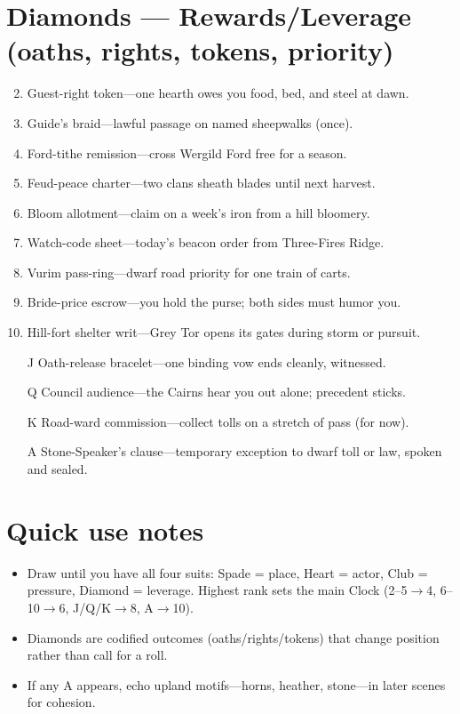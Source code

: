 \section*{Diamonds --- Rewards/Leverage (oaths, rights, tokens, priority)}
\begin{enumerate}
\setcounter{enumi}{1}
\item Guest-right token---one hearth owes you food, bed, and steel at dawn.
\item Guide's braid---lawful passage on named sheepwalks (once).
\item Ford-tithe remission---cross Wergild Ford free for a season.
\item Feud-peace charter---two clans sheath blades until next harvest.
\item Bloom allotment---claim on a week's iron from a hill bloomery.
\item Watch-code sheet---today's beacon order from Three-Fires Ridge.
\item Vurim pass-ring---dwarf road priority for one train of carts.
\item Bride-price escrow---you hold the purse; both sides must humor you.
\item Hill-fort shelter writ---Grey Tor opens its gates during storm or pursuit.
\item[J] Oath-release bracelet---one binding vow ends cleanly, witnessed.
\item[Q] Council audience---the Cairns hear you out alone; precedent sticks.
\item[K] Road-ward commission---collect tolls on a stretch of pass (for now).
\item[A] Stone-Speaker's clause---temporary exception to dwarf toll or law, spoken and sealed.
\end{enumerate}

\section*{Quick use notes}
\begin{itemize}
\item Draw until you have all four suits: Spade = place, Heart = actor, Club = pressure, Diamond = leverage. Highest rank sets the main Clock (2--5$\rightarrow$4, 6--10$\rightarrow$6, J/Q/K$\rightarrow$8, A$\rightarrow$10).
\item Diamonds are codified outcomes (oaths/rights/tokens) that change position rather than call for a roll.
\item If any A appears, echo upland motifs---horns, heather, stone---in later scenes for cohesion.
\end{itemize}
